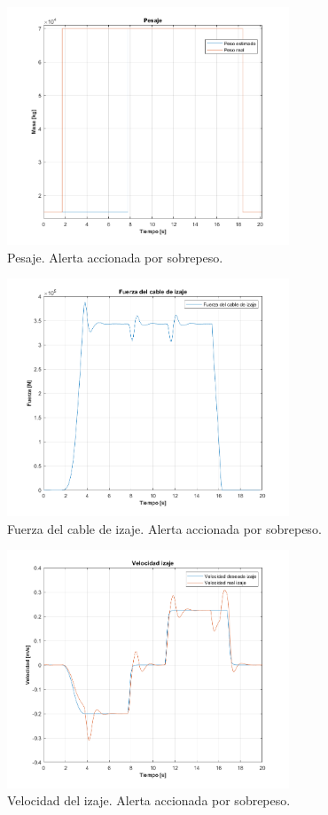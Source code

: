 \documentclass[11pt]{article}
\begin{document}
\begin{figure}[!h]
	\centering
	\includegraphics[width=0.75\textwidth]{images/sobrepeso/pesaje.png}
	\caption{Pesaje. Alerta accionada por sobrepeso.}
	\label{fig:sobrepeso_pesaje}
\end{figure}

\begin{figure}[!h]
	\centering
	\includegraphics[width=0.75\textwidth]{images/sobrepeso/fuerza_cable.png}
	\caption{Fuerza del cable de izaje. Alerta accionada por sobrepeso.}
	\label{fig:sobrepeso_fuerza_cable}
\end{figure}

\begin{figure}[!h]
	\centering
	\includegraphics[width=0.75\textwidth]{images/sobrepeso/velocidad_izaje.png}
	\caption{Velocidad del izaje. Alerta accionada por sobrepeso.}
	\label{fig:sobrepeso_velocidad_izaje}
\end{figure}
\end{document}
